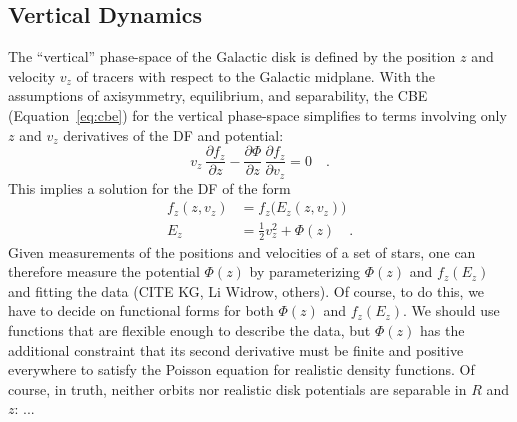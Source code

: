 \subsection{Vertical Dynamics} \label{sec:vertical}


The ``vertical'' phase-space of the Galactic disk is defined by the position $z$ and
velocity $v_z$ of tracers with respect to the Galactic midplane.
With the assumptions of axisymmetry, equilibrium, and separability, the CBE
(Equation~\ref{eq:cbe}) for the vertical phase-space simplifies to terms involving only
$z$ and $v_z$ derivatives of the DF and potential:
\begin{equation}
    v_z \, \frac{\partial f_z}{\partial z} - \frac{\partial \Phi}{\partial z} \, \frac{\partial f_z}{\partial v_z} = 0 \quad .
    \label{eq:cbe-1d}
\end{equation}
This implies a solution for the DF of the form
\begin{align}
    f_z(z, v_z) &= f_z\Big(E_z(z, v_z)\Big)\\
    E_z &= \frac{1}{2} v_z^2 + \Phi(z) \quad .
\end{align}
Given measurements of the positions and velocities of a set of stars, one can therefore
measure the potential $\Phi(z)$ by parameterizing $\Phi(z)$ and $f_z(E_z)$ and fitting
the data (CITE KG, Li Widrow, others).
Of course, to do this, we have to decide on functional forms for both $\Phi(z)$ and
$f_z(E_z)$.
We should use functions that are flexible enough to describe the data, but $\Phi(z)$ has
the additional constraint that its second derivative must be finite and positive
everywhere to satisfy the Poisson equation for realistic density functions.
Of course, in truth, neither orbits nor realistic disk potentials are separable in $R$ and $z$: ...



